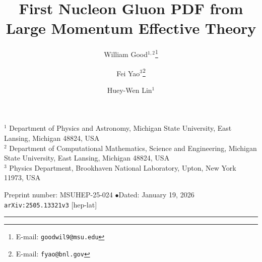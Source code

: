 \documentclass[11pt]{article}
\title{\textbf{First Nucleon Gluon PDF from Large Momentum Effective Theory}}
\author{William Good$^{1,2}$\thanks{E-mail: \texttt{goodwil9@msu.edu}}
        \and Fei Yao$^{3}$\thanks{E-mail: \texttt{fyao@bnl.gov}}
        \and Huey-Wen Lin$^{1}$}
\date{}
\begin{document}
\maketitle
\vspace{-3.5em}
\begin{center}\small
$^{1}$ Department of Physics and Astronomy, Michigan State University,
East Lansing, Michigan 48824, USA\\[2pt]
$^{2}$ Department of Computational Mathematics, Science and Engineering,
Michigan State University, East Lansing, Michigan 48824, USA\\[2pt]
$^{3}$ Physics Department, Brookhaven National Laboratory,
Upton, New York 11973, USA
\end{center}
\vspace{0.6em}
\begin{center}\small
Preprint number: MSUHEP-25-024 \quad$\bullet$\quad Dated: January 19, 2026\\
\texttt{arXiv:2505.13321v3} [hep-lat]
\end{center}
\noindent\rule{\textwidth}{0.4pt}












\end{document}
